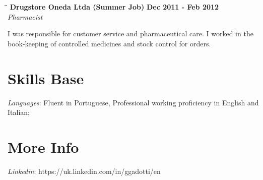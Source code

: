 \documentclass[margin]{res}
\begin{document}
\begin{resume}
\vspace{-0.1in}
   \begin{tabbing}
   \hspace{2.3in}\= \hspace{1.7in}\= \kill %
    \textbf{Drugstore Oneda Ltda (Summer Job)}    \>\>\textbf{Dec 2011 - Feb 2012}\\
    \textit{Pharmacist}\\   
   \end{tabbing}\vspace{-20pt}      %
I was responsible for customer service and pharmaceutical care. I worked in the book-keeping of controlled
medicines and stock control for orders.

\section{Skills Base}
			\textit{Languages}: Fluent in Portuguese, Professional working proficiency in English and Italian;
 
\section{More Info}
      \textit{Linkedin}: https://uk.linkedin.com/in/ggadotti/en

\end{resume}
\end{document}
